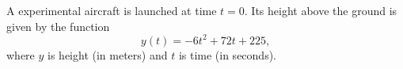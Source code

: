 \documentclass[addpoints, 12pt]{exam}
\begin{document}
\begin{questions}

\newpage 

\question[10]
A experimental aircraft is launched at time $t=0$.  Its height above the ground is given by the function \begin{equation*}
	y(t) = -6t^2 + 72t + 225 ,
\end{equation*}
where $y$ is height (in meters) and $t$ is time (in seconds).

\end{questions}
\end{document}
